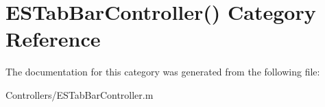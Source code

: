 \hypertarget{category_e_s_tab_bar_controller_07_08}{}\section{E\+S\+Tab\+Bar\+Controller() Category Reference}
\label{category_e_s_tab_bar_controller_07_08}


The documentation for this category was generated from the following file\+:\begin{DoxyCompactItemize}
\item 
Controllers/E\+S\+Tab\+Bar\+Controller.\+m\end{DoxyCompactItemize}

